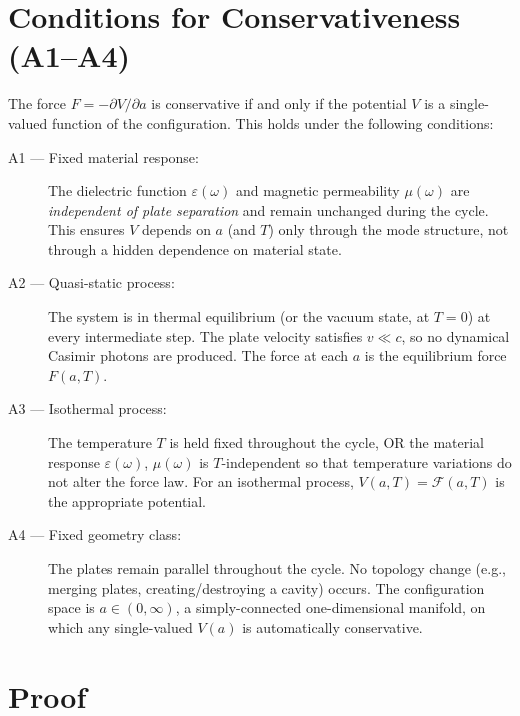 \documentclass[11pt]{article}
\begin{document}
\section{Conditions for Conservativeness (A1--A4)}

The force $F = -\partial V / \partial a$ is conservative if and only if
the potential $V$ is a single-valued function of the configuration.
This holds under the following conditions:

\begin{description}
  \item[A1 --- Fixed material response:]
    The dielectric function $\varepsilon(\omega)$ and magnetic
    permeability $\mu(\omega)$ are \emph{independent of plate separation}
    and remain unchanged during the cycle. This ensures $V$ depends on $a$
    (and $T$) only through the mode structure, not through a hidden
    dependence on material state.

  \item[A2 --- Quasi-static process:]
    The system is in thermal equilibrium (or the vacuum state, at $T=0$)
    at every intermediate step. The plate velocity satisfies $v \ll c$,
    so no dynamical Casimir photons are produced. The force at each $a$
    is the equilibrium force $F(a,T)$.

  \item[A3 --- Isothermal process:]
    The temperature $T$ is held fixed throughout the cycle, OR the
    material response $\varepsilon(\omega)$, $\mu(\omega)$ is
    $T$-independent so that temperature variations do not alter the
    force law. For an isothermal process, $V(a,T) = \mathcal{F}(a,T)$
    is the appropriate potential.

  \item[A4 --- Fixed geometry class:]
    The plates remain parallel throughout the cycle. No topology change
    (e.g., merging plates, creating/destroying a cavity) occurs.
    The configuration space is $a \in (0, \infty)$, a simply-connected
    one-dimensional manifold, on which any single-valued $V(a)$ is
    automatically conservative.
\end{description}

\section{Proof}
\end{document}
